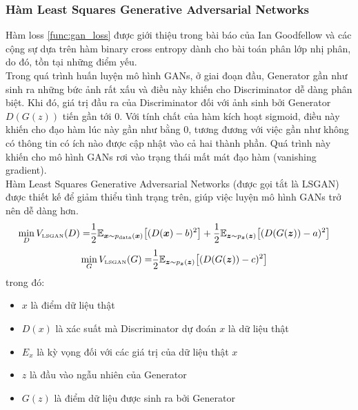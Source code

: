 {    \subsubsection{Hàm Least Squares Generative Adversarial Networks}
    \label{sec_lsgan}
    Hàm loss \ref{func:gan_loss} được giới thiệu trong bài báo của Ian Goodfellow và các cộng sự dựa trên hàm binary cross entropy dành cho bài toán phân lớp nhị phân, do đó, tồn tại những điểm yếu.\\
    Trong quá trình huấn luyện mô hình GANs, ở giai đoạn đầu, Generator gần như sinh ra những bức ảnh rất xấu và điều này khiến cho Discriminator dễ dàng phân biệt. Khi đó, giá trị đầu ra của Discriminator đối với ảnh sinh bởi Generator $D(G(z))$ tiến gần tới 0. Với tính chất của hàm kích hoạt sigmoid, điều này khiến cho đạo hàm lúc này gần như bằng 0, tương đương với việc gần như không có thông tin có ích nào được cập nhật vào cả hai thành phần. Quá trình này khiến cho mô hình GANs rơi vào trạng thái mất mát đạo hàm (vanishing gradient).\\
    Hàm Least Squares Generative Adversarial Networks (được gọi tắt là LSGAN) được thiết kế để giảm thiểu tình trạng trên, giúp việc luyện mô hình GANs trở nên dễ dàng hơn.
    \begin{align}
    \min_D V_{\text{\tiny LSGAN}}(D) = &\frac{1}{2}\mathbb{E}_{\bm{x} \sim p_{\text{data}}(\bm{x})}\bigl[(D(\bm{x})-b)^2\bigr]+ \frac{1}{2}\mathbb{E}_{\bm{z} \sim p_{\bm{z}}(\bm{z})}\bigl[(D(G(\bm{z}))-a)^2\bigr]
    \end{align}
    \begin{align}
    \min_G V_{\text{\tiny LSGAN}}(G) = &\frac{1}{2}\mathbb{E}_{\bm{z} \sim p_{\bm{z}}(\bm{z})}\bigl[(D(G(\bm{z}))-c)^2\bigr]
    \end{align}
    trong đó:
    \begin{itemize}[leftmargin=0cm,itemindent=.5cm,labelwidth=\itemindent,labelsep=0cm,align=left]
        \item $x$ là điểm dữ liệu thật
        \item $D(x)$ là xác suất mà Discriminator dự đoán $x$ là dữ liệu thật
        \item $E_x$ là kỳ vọng đối với các giá trị của dữ liệu thật $x$
        \item $z$ là đầu vào ngẫu nhiên của Generator
        \item $G(z)$ là điểm dữ liệu được sinh ra bởi Generator

\end{itemize}}
